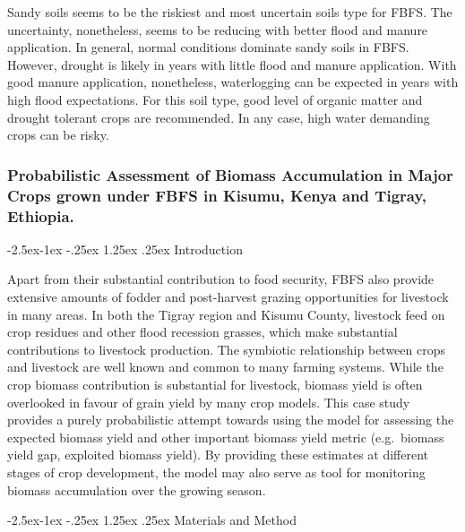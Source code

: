 \documentclass[12pt,oneside]{article}
\makeatletter
\renewcommand\paragraph{\@startsection{paragraph}{4}{\z@}%
            {-2.5ex\@plus -1ex \@minus -.25ex}%
            {1.25ex \@plus .25ex}%
            {\normalfont\normalsize\bfseries}}
\makeatother
\begin{document}
Sandy soils seems to be the riskiest and most uncertain soils type for FBFS. The uncertainty, nonetheless, seems to be reducing with better flood and manure application. In general, normal conditions dominate sandy soils in FBFS. However, drought is likely in years with little flood and manure application. With good manure application, nonetheless, waterlogging can be expected in years with high flood expectations. For this soil type, good level of organic matter and drought tolerant crops are recommended. In any case, high water demanding crops can be risky.

\hypertarget{IV22}{%
\subsubsection{Probabilistic Assessment of Biomass Accumulation in Major Crops grown under FBFS in Kisumu, Kenya and Tigray, Ethiopia.}\label{IV22}}

\hypertarget{IV221}{%
\paragraph{Introduction}\label{IV221}}

Apart from their substantial contribution to food security, FBFS also provide extensive amounts of fodder and post-harvest grazing opportunities for livestock in many areas. In both the Tigray region and Kisumu County, livestock feed on crop residues and other flood recession grasses, which make substantial contributions to livestock production. The symbiotic relationship between crops and livestock are well known and common to many farming systems. While the crop biomass contribution is substantial for livestock, biomass yield is often overlooked in favour of grain yield by many crop models. This case study provides a purely probabilistic attempt towards using the model for assessing the expected biomass yield and other important biomass yield metric (e.g.~biomass yield gap, exploited biomass yield). By providing these estimates at different stages of crop development, the model may also serve as tool for monitoring biomass accumulation over the growing season.

\hypertarget{IV222}{%
\paragraph{Materials and Method}\label{IV222}}
\end{document}
